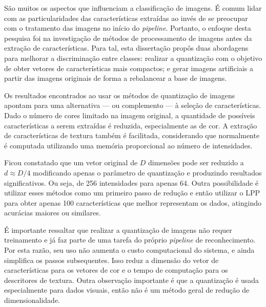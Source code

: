 
São muitos os aspectos que influenciam a classificação de imagens. É comum lidar com as particularidades das características extraídas ao invés de se preocupar com o tratamento das imagens no início do \textit{pipeline}. Portanto, o enfoque desta pesquisa foi na investigação de métodos de processamento de imagens antes da extração de características. Para tal, esta dissertação propôs duas abordagens para melhorar a discriminação entre classes: realizar a quantização com o objetivo de obter vetores de características mais compactos; e gerar imagens artificiais a partir das imagens originais de forma a rebalancear a base de imagens.

Os resultados encontrados ao usar os métodos de quantização de imagens apontam para uma alternativa --- ou complemento --- à seleção de características. Dado o número de cores limitado na imagem original, a quantidade de possíveis características a serem extraídas é reduzida, especialmente as de cor. A extração de características de textura também é facilitada, considerando que normalmente é computada utilizando uma memória proporcional ao número de intensidades.

Ficou constatado que um vetor original de $D$ dimensões pode ser reduzido a $d \approx D/4$ modificando apenas o parâmetro de quantização e produzindo resultados significativos. Ou seja, de 256 intensidades para apenas 64. Outra possibilidade é utilizar esses métodos como um primeiro passo de redução e então utilizar o LPP para obter apenas 100 características que melhor representam os dados, atingindo acurácias maiores ou similares.

É importante ressaltar que realizar a quantização de imagens não requer treinamento e já faz parte de uma tarefa do próprio \textit{pipeline} de reconhecimento. Por esta razão, seu uso não aumenta o custo computacional do sistema, e ainda simplifica os passos subsequentes. Isso reduz a dimensão do vetor de características para os vetores de cor e o tempo de computação para os descritores de textura. Outra observação importante é que a quantização é usada especialmente para dados visuais, então não é um método geral de redução de dimensionalidade.


